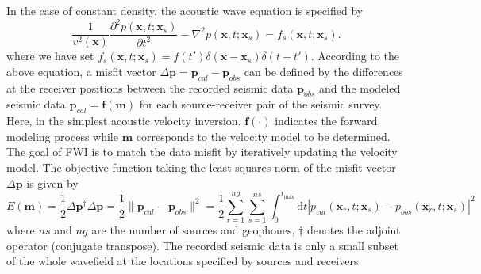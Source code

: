 In the case of constant density, the acoustic wave equation is specified by
\begin{equation}\label{eq:acoustic}
\frac{1}{v^2(\textbf{x})}\frac{\partial^2 p(\textbf{x},t;\textbf{x}_s)}{\partial t^2}-\nabla^2 p(\textbf{x},t;\textbf{x}_s)=f_s(\textbf{x},t;\textbf{x}_s).
\end{equation}
where we have set $ f_s(\textbf{x},t;\textbf{x}_s)=f(t')\delta(\textbf{x}-\textbf{x}_s)\delta(t-t')$. 
According to the above equation, a misfit vector  $\Delta \textbf{p}=\textbf{p}_{cal}-\textbf{p}_{obs}$ can be defined by the differences at the receiver positions between the recorded seismic data $\textbf{p}_{obs}$ and the modeled seismic data $\textbf{p}_{cal}=\textbf{f}(\textbf{m})$ for each source-receiver pair of the seismic survey. Here, in the simplest acoustic velocity inversion, $\textbf{f}(\cdot)$ indicates the forward modeling process while $\textbf{m}$ corresponds to the velocity model to be determined. The goal of FWI is to match the data misfit by iteratively updating the velocity model. The objective function taking the least-squares norm of the misfit vector $\Delta \textbf{p}$ is given by
\begin{equation}\label{eq:obj}
E(\textbf{m})=\frac{1}{2}\Delta \textbf{p}^{\dagger}\Delta \textbf{p}
=\frac{1}{2}\|\textbf{p}_{cal}-\textbf{p}_{obs}\|^2
=\frac{1}{2}\sum_{r=1}^{ng}\sum_{s=1}^{ns}\int_{0}^{t_{\max}}\mathrm{d}t|p_{cal}(\textbf{x}_r, t;\textbf{x}_s)-p_{obs}(\textbf{x}_r, t;\textbf{x}_s)|^2
\end{equation}
where $ns$ and $ng$ are the number of sources and geophones, $\dagger$ denotes the adjoint operator (conjugate transpose). The recorded seismic data is only a small subset of the whole wavefield at the locations specified by sources and receivers.

